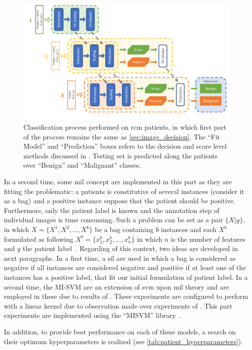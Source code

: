 \documentclass[journal,article,submit,moreauthors,pdftex, applsci]{Definitions/mdpi}
\begin{document}
\begin{figure}[h]
    \begin{center}
        \includegraphics[width=\linewidth]{Figures/Process_Decision.pdf}
        \caption{Classification process performed on \ac{rcm} patients, in which first part of the process remains the same as \cref{sec:image_decision}. The “Fit Model” and “Prediction” boxes refers to the decision and score level methods discussed in . Testing set is predicted along the patients over “Benign” and “Malignant” classes.}
        \label{fig:decision_process}
    \end{center} 
\end{figure}\par
In a second time, some \ac{mil} concept are implemented in this part as they are fitting the problematic: a patients is constitutive of several instances (consider it as a bag) and a positive instance suppose that the patient should be positive. Furthermore, only the patient label is known and the annotation step of individual images is time consuming. Such a problem can be set as a pair \(\{X|y\}\), in which \(X=\{X^1,X^2,\ldots,X^b\}\) be a bag containing \(b\) instances and each \(X^b\) formulated as following \(X^b=\{x^b_1,x^b_2,\ldots,x^b_n\}\) in which \(n\) is the number of features and \(y\) the patient label~\cite{foulds_frank_2010}. Regarding of this context, two ideas are developed in next paragraphs. In a first time, a \ac{sil} are used in which a bag is considered as negative if all instances are considered negative and positive if at least one of the instances has a positive label, that fit our initial formulation of patient label. In a second time, the MI-SVM are an extension of \ac{svm} upon \ac{mil} theory and are employed in these due to results of . These experiments are configured to perform with a linear kernel due to observation made over experiments of . This part experiments are implemented using the “MISVM” library~\cite{Doran2014}.\par
In addition, to provide best performance on each of these models, a search on their optimum hyperparameters is realized (see \cref{tab:patient_hyperparameters}).\par
\end{document}
